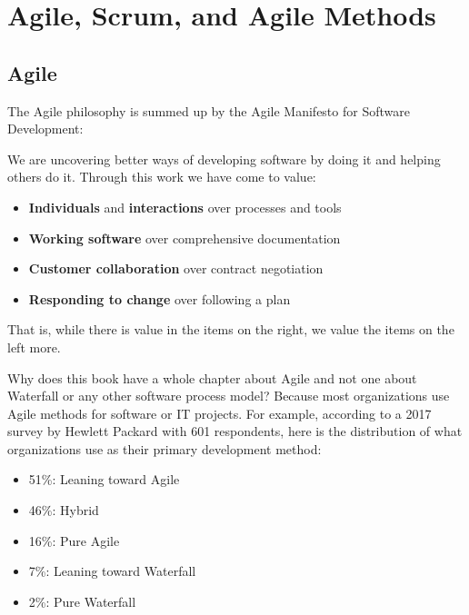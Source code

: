 \section{Agile, Scrum, and Agile Methods}

\subsection{Agile}

The Agile philosophy is summed up by the Agile Manifesto for Software Development:

\begin{displayquote}
We are uncovering better ways of developing software by doing it and helping others do it. Through this work we have come to value:
\begin{itemize}
\item \textbf{Individuals} and \textbf{interactions} over processes and tools
\item \textbf{Working software} over comprehensive documentation
\item \textbf{Customer collaboration} over contract negotiation
\item \textbf{Responding to change} over following a plan
\end{itemize}
That is, while there is value in the items on the right, we value the items on the left more.
\end{displayquote}

Why does this book have a whole chapter about Agile and not one about Waterfall or any other software process model? Because most organizations use Agile methods for software or IT projects. For example, according to a 2017 survey by Hewlett Packard with 601 respondents, here is the distribution of what organizations use as their primary development method:

\begin{itemize}
\item 51\%: Leaning toward Agile
\item 46\%: Hybrid
\item 16\%: Pure Agile
\item 7\%: Leaning toward Waterfall
\item 2\%: Pure Waterfall
\end{itemize}


